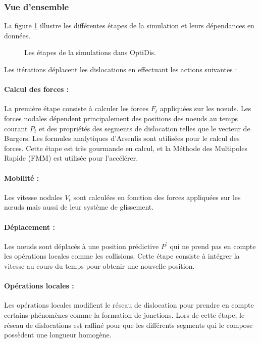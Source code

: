 \documentclass[11pt,class=article,float=false,crop=false]{standalone}
\begin{document}
\subsubsection{Vue d'ensemble}

La figure \ref{fig:deroulement_simulation} illustre les différentes étapes de la simulation et leurs dépendances en données.

\begin{figure}[H]
	\centering
	\caption{Les étapes de la simulations dans OptiDis.}
	\label{fig:deroulement_simulation}
\end{figure}

Les itérations déplacent les dislocations en effectuant les actions suivantes :

\paragraph{Calcul des forces : }
La première étape consiste à calculer les forces $F_t$ appliquées sur les nœuds. Les forces nodales dépendent principalement des positions des noeuds au temps courant $P_t$ et des propriétés des segments de dislocation telles que le vecteur de Burgers. Les formules analytiques d'Arsenlis sont utilisées pour le calcul des forces. Cette étape est très gourmande en calcul, et la Méthode des Multipoles Rapide (FMM) est utilisée pour l'accélérer. 

\paragraph{Mobilité : }

Les vitesse nodales $V_t$ sont calculées en fonction des forces appliquées sur les nœuds mais aussi de leur système de glissement. 

\paragraph{Déplacement : }

Les nœuds sont déplacés à une position prédictive $P^\prime$ qui ne prend pas en compte les opérations locales comme les collisions. Cette étape consiste à intégrer la vitesse au cours du temps pour obtenir une nouvelle position.

\paragraph{Opérations locales : }
Les opérations locales modifient le réseau de dislocation pour prendre en compte certains phénomènes comme la formation de jonctions. Lors de cette étape, le réseau de dislocations est raffiné pour que les différents segments qui le compose possèdent une longueur homogène.
\end{document}
